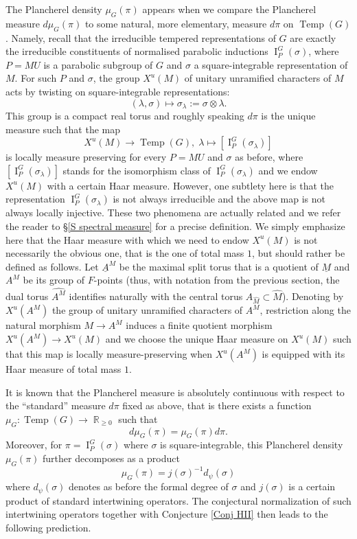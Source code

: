 \documentclass[12pt]{article}
\numberwithin{equation}{section}
\DeclareMathOperator{\Temp}{Temp}
\DeclareMathOperator{\bR}{\mathbb{R}}
\DeclareMathOperator{\rI}{\mathrm{I}}
\begin{document}
The Plancherel density $\mu_G(\pi)$ appears when we compare the Plancherel measure $d\mu_G(\pi)$ to some natural, more elementary, measure $d\pi$ on $\Temp(G)$. Namely, recall that the irreducible tempered representations of $G$ are exactly the irreducible constituents of normalised parabolic inductions $\rI_P^G(\sigma)$, where $P=MU$ is a parabolic subgroup of $G$ and $\sigma$ a square-integrable representation of $M$. For such $P$ and $\sigma$, the group $X^u(M)$ of unitary unramified characters of $M$ acts by twisting on square-integrable representations:
$$\displaystyle (\lambda,\sigma)\mapsto \sigma_\lambda:=\sigma\otimes \lambda.$$
This group is a compact real torus and roughly speaking $d\pi$ is the unique measure such that the map
\begin{equation*}
	\displaystyle X^u(M)\to \Temp(G),\; \lambda\mapsto [\rI_P^G(\sigma_\lambda)]
\end{equation*}
is locally measure preserving for every $P=MU$ and $\sigma$ as before, where $[\rI_P^G(\sigma_\lambda)]$ stands for the isomorphism class of $\rI_P^G(\sigma_\lambda)$ and we endow $X^u(M)$ with a certain Haar measure. However, one subtlety here is that the representation $\rI_P^G(\sigma_\lambda)$ is not always irreducible and the above map is not always locally injective. These two phenomena are actually related and we refer the reader to \S \ref{S spectral measure} for a precise definition. We simply emphasize here that the Haar measure with which we need to endow $X^u(M)$ is not necessarily the obvious one, that is the one of total mass $1$, but should rather be defined as follows. Let $\underline{A}^M$ be the maximal split torus that is a quotient of $\underline{M}$ and $A^M$ be its group of $F$-points (thus, with notation from the previous section, the dual torus $\widehat{A^M}$ identifies naturally with the central torus $A_{\widehat{M}}\subset \widehat{M}$). Denoting by $X^u(A^M)$ the group of unitary unramified characters of $A^M$, restriction along the natural morphism $M\to A^M$ induces a finite quotient morphism $X^u(A^M)\to X^u(M)$ and we choose the unique Haar measure on $X^u(M)$ such that this map is locally measure-preserving when $X^u(A^M)$ is equipped with its Haar measure of total mass $1$. 


It is known that the Plancherel measure is absolutely continuous with respect to the ``standard'' measure $d\pi$ fixed as above, that is there exists a function $\mu_G:\Temp(G)\to \bR_{\geq 0}$ such that
$$\displaystyle d\mu_G(\pi)=\mu_G(\pi)d\pi.$$
Moreover, for $\pi=\rI_P^G(\sigma)$ where $\sigma$ is square-integrable, this Plancherel density $\mu_G(\pi)$ further decomposes as a product
$$\displaystyle \mu_G(\pi)=j(\sigma)^{-1} d_\psi(\sigma)$$
where $d_\psi(\sigma)$ denotes as before the formal degree of $\sigma$ and $j(\sigma)$ is a certain product of standard intertwining operators. The conjectural normalization \cite[Appendix II]{LangEis} of such intertwining operators together with Conjecture \ref{Conj HII} then leads to the following prediction.
\end{document}
